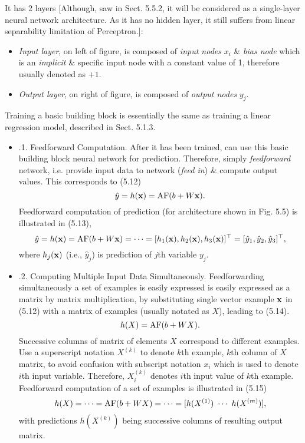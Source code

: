 \documentclass{article}
\begin{document}
\begin{itemize}
\begin{itemize}
		It has 2 layers [Although, saw in Sect. 5.5.2, it will be considered as a single-layer neural network architecture. As it has no hidden layer, it still suffers from linear separability limitation of Perceptron.]:
		\begin{itemize}
			\item {\it Input layer}, on left of figure, is composed of {\it input nodes} $x_i$ \& {\it bias node} which is an {\it implicit} \& specific input node with a constant value of 1, therefore usually denoted as $+1$.
			\item {\it Output layer}, on right of figure, is composed of {\it output nodes} $y_j$.
		\end{itemize}
		Training a basic building block is essentially the same as training a linear regression model, described in Sect. 5.1.3.
		\begin{itemize}
			\item {.1. Feedforward Computation.} After it has been trained, can use this basic building block neural network for prediction. Therefore, simply {\it feedforward} network, i.e. provide input data to network ({\it feed in}) \& compute output values. This corresponds to (5.12)
			\begin{equation*}
				\hat{y} = h({\bf x}) = {\rm AF}(b + W{\bf x}).
			\end{equation*}
			Feedforward computation of prediction (for architecture shown in {\sf Fig. 5.5}) is illustrated in (5.13),
			\begin{equation*}
				\hat{y} = h({\bf x}) = {\rm AF}(b + W{\bf x}) = \cdots = [h_1({\bf x}),h_2({\bf x}),h_3({\bf x})]^\top = [\hat{y}_1,\hat{y}_2,\hat{y}_3]^\top,
			\end{equation*}
			where $h_j({\bf x})$ (i.e., $\hat{y}_j$) is prediction of $j$th variable $y_j$.
			\item {.2. Computing Multiple Input Data Simultaneously.} Feedforwarding simultaneously a set of examples is easily expressed is easily expressed as a matrix by matrix multiplication, by substituting single vector example ${\bf x}$ in (5.12) with a matrix of examples (usually notated as $X$), leading to (5.14).
			\begin{equation*}
				h(X) = {\rm AF}(b +  WX).
			\end{equation*}
			Successive columns of matrix of elements $X$ correspond to different examples. Use a superscript notation $X^{(k)}$ to denote $k$th example, $k$th column of $X$ matrix, to avoid confusion with subscript notation $x_i$ which is used to denote $i$th input variable. Therefore, $X_i^{(k)}$ denotes $i$th input value of $k$th example. Feedforward computation of a set of examples is illustrated in (5.15)
			\begin{equation*}
				h(X) = \cdots = {\rm AF}(b + WX) = \cdots = [h(X^{(1)})\ \cdots\ h(X^{(m)})],
			\end{equation*}
			with predictions $h(X^(k))$ being successive columns of resulting output matrix.


\end{itemize}
\end{itemize}
\end{itemize}
\end{document}
